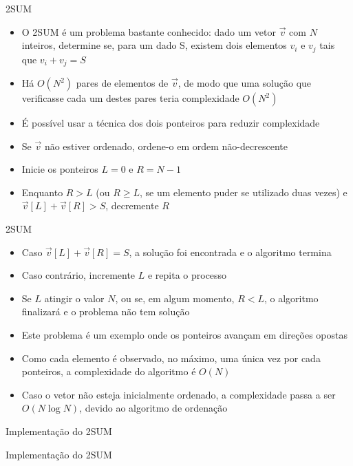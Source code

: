 \begin{frame}[fragile]{2SUM}

    \begin{itemize}
        \item O 2SUM é um problema bastante conhecido: dado um vetor $\vec{v}$ com $N$ inteiros,
            determine se, para um dado S, existem dois elementos $v_i$ e $v_j$ tais que 
            $v_i + v_j = S$

        \item Há $O(N^2)$ pares de elementos de $\vec{v}$, de modo que uma solução que verificasse
            cada um destes pares teria complexidade $O(N^2)$

        \item É possível usar a técnica dos dois ponteiros para reduzir complexidade

        \item Se $\vec{v}$ não estiver ordenado, ordene-o em ordem não-decrescente

        \item Inicie os ponteiros $L = 0$ e $R = N - 1$

        \item Enquanto $R > L$ (ou $R\geq L$, se um elemento puder se utilizado duas vezes) e
            $\vec{v}[L] + \vec{v}[R] > S$, decremente $R$

    \end{itemize}

\end{frame}

\begin{frame}[fragile]{2SUM}

    \begin{itemize}
        \item Caso $\vec{v}[L] + \vec{v}[R] = S$, a solução foi encontrada e o algoritmo
            termina

        \item Caso contrário, incremente $L$ e repita o processo

        \item Se $L$ atingir o valor $N$, ou se, em algum momento, $R < L$, o algoritmo finalizará
            e o problema não tem solução

        \item Este problema é um exemplo onde os ponteiros avançam em direções opostas

        \item Como cada elemento é observado, no máximo, uma única vez por cada ponteiros, a
            complexidade do algoritmo é $O(N)$

        \item Caso o vetor não esteja inicialmente ordenado, a complexidade passa a ser
            $O(N\log N)$, devido ao algoritmo de ordenação
    \end{itemize}

\end{frame}

\begin{frame}[fragile]{Implementação do 2SUM}
\end{frame}

\begin{frame}[fragile]{Implementação do 2SUM}
\end{frame}
